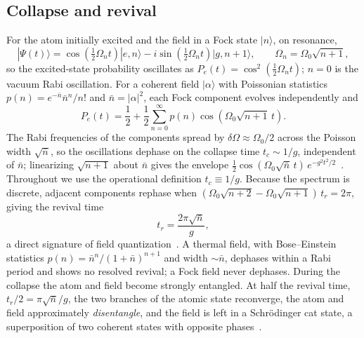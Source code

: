 \documentclass{iopjournal}
\begin{document}
\subsection{Collapse and revival}
\label{sec:collapse_revival}
For the atom initially excited and the field in a Fock state $|n\rangle$, on resonance,
\begin{equation}
|\Psi(t)\rangle = \cos\!\left(\tfrac{1}{2}\Omega_n t\right)|e,n\rangle - i\sin\!\left(\tfrac{1}{2}\Omega_n t\right)|g,n{+}1\rangle, \qquad \Omega_n = \Omega_0\sqrt{n+1},
\label{eq:rabi_evolution}
\end{equation}
so the excited-state probability oscillates as $P_e(t) = \cos^2(\tfrac{1}{2}\Omega_n t)$; $n = 0$ is the vacuum Rabi oscillation. For a coherent field $|\alpha\rangle$ with Poissonian statistics $p(n) = e^{-\bar{n}}\bar{n}^n/n!$ and $\bar{n} = |\alpha|^2$, each Fock component evolves independently and
\begin{equation}
P_e(t) = \frac{1}{2} + \frac{1}{2}\sum_{n=0}^{\infty} p(n)\cos\!\left(\Omega_0\sqrt{n+1}\,t\right).
\label{eq:pe_cos_sum}
\end{equation}
The Rabi frequencies of the components spread by $\delta\Omega \approx \Omega_0/2$ across the Poisson width $\sqrt{\bar{n}}$, so the oscillations dephase on the collapse time $t_c \sim 1/g$, independent of $\bar{n}$; linearizing $\sqrt{n+1}$ about $\bar{n}$ gives the envelope $\tfrac{1}{2}\cos(\Omega_0\sqrt{\bar{n}}\,t)\,e^{-g^2t^2/2}$~\cite{eberly1980}. Throughout we use the operational definition $t_c \equiv 1/g$. Because the spectrum is discrete, adjacent components rephase when $(\Omega_0\sqrt{n+2} - \Omega_0\sqrt{n+1})\,t_r = 2\pi$, giving the revival time
\begin{equation}
t_r = \frac{2\pi\sqrt{\bar{n}}}{g},
\label{eq:t_revival}
\end{equation}
a direct signature of field quantization~\cite{eberly1980, haroche2006}. A thermal field, with Bose--Einstein statistics $p(n) = \bar{n}^n/(1+\bar{n})^{n+1}$ and width $\sim\bar{n}$, dephases within a Rabi period and shows no resolved revival; a Fock field never dephases. During the collapse the atom and field become strongly entangled. At half the revival time, $t_r/2 = \pi\sqrt{\bar{n}}/g$, the two branches of the atomic state reconverge, the atom and field approximately \emph{disentangle}, and the field is left in a Schr\"{o}dinger cat state, a superposition of two coherent states with opposite phases~\cite{gea-banacloche1990, gea-banacloche1991, phoenix1991}.
\end{document}
